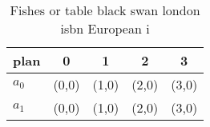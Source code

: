 \documentclass[a4paper]{article}
\begin{document}
\begin{table}
\begin{adjustbox}{width=0.7\columnwidth}
\begin{tabular}{|l|l|l|l|l|}
\hline
\textbf{plan} & \multicolumn{1}{c|}{\textbf{0}} & \multicolumn{1}{c|}{\textbf{1}} & \multicolumn{1}{c|}{\textbf{2}} & \multicolumn{1}{c|}{\textbf{3}} \\ \hline
\textbf{$a_0$}  & (0,0) & (1,0) & (2,0) & (3,0) \\ \hline
\textbf{$a_1$}  & (0,0) & (1,0) & (2,0) & (3,0) \\ \hline
\end{tabular}
\end{adjustbox}
\caption{Fishes or table black swan london isbn European i
}
\end{table}
\end{document}
